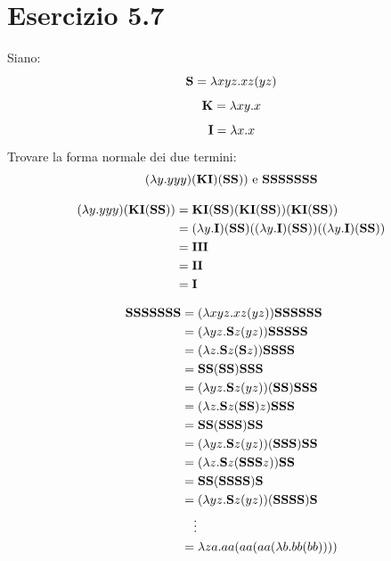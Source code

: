	\section{Esercizio 5.7}
	
		\qquad Siano:
		\begin{equation*}
			\svar = \lambda xyz.xz(yz)
		\end{equation*}
		\begin{equation*}
			\kvar = \lambda xy.x
		\end{equation*}
		\begin{equation*}
			\ivar = \lambda x.x
		\end{equation*}
		Trovare la forma normale dei due termini:
		\begin{equation*}
			(\lambda y.yyy)(\kvar\ivar)(\ssvar))\text{ e }\sssssssvar
		\end{equation*}
		
		\sectionline
		
		\begin{align*}
			(\lambda y.yyy)(\kvar\ivar(\ssvar)) & =
			\kvar\ivar(\ssvar)(\kvar\ivar(\ssvar))(\kvar\ivar(\ssvar))\\
			& = (\lambda y.\ivar)(\ssvar)((\lambda y.\ivar)(\ssvar))((\lambda
			y.\ivar)(\ssvar))\\
			& = \ivar\ivar\ivar\\
			& = \ivar\ivar\\
			& = \ivar\\
		\end{align*}
		
		\begin{align*}
			\sssssssvar & = (\lambda xyz.xz(yz))\ssssssvar\\
			& = (\lambda yz.\svar z(yz))\sssssvar\\
			& = (\lambda z.\svar z(\svar z))\ssssvar\\
			& = \ssvar(\ssvar)\sssvar\\
			& = (\lambda yz.\svar z(yz))(\ssvar)\sssvar\\
			& = (\lambda z.\svar z(\ssvar)z)\sssvar\\
			& = \ssvar(\sssvar)\ssvar\\
			& = (\lambda yz.\svar z(yz))(\sssvar)\ssvar\\
			& = (\lambda z.\svar z(\sssvar z))\ssvar\\
			& = \ssvar(\ssssvar)\svar\\
			& = (\lambda yz.\svar z(yz))(\ssssvar)\svar\\
			& \quad \vdots\\
			& = \lambda za.a a(a a(a a(\lambda b.b b(b b))))\\
		\end{align*}
		
